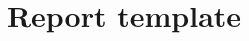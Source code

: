 \documentclass[a4paper, 12pt]{article}
\title{Report template}
\begin{document}

\maketitle


\begin{appendices}
%
%
%
\end{appendices}


\end{document}
